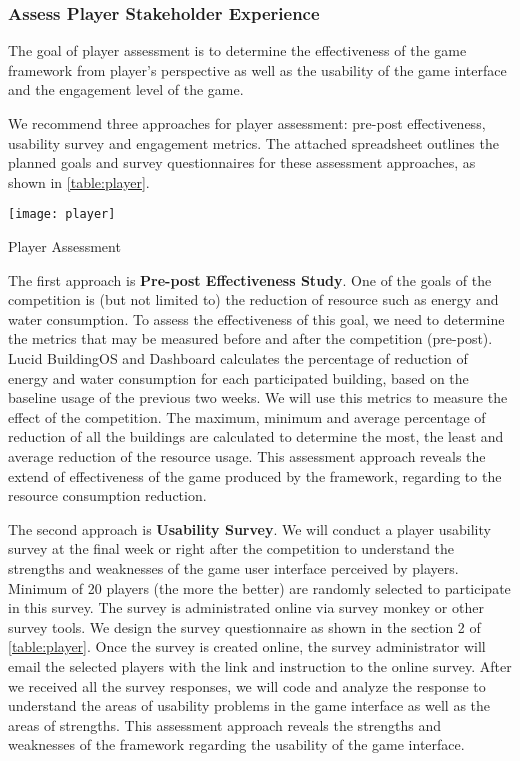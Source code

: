 \subsubsection{Assess Player Stakeholder Experience}

The goal of player assessment is to determine the effectiveness of the game
framework from player's perspective as well as the usability of the game interface and the engagement level of the game. 

We recommend three approaches for player assessment: pre-post effectiveness, usability survey and engagement metrics. The attached spreadsheet outlines the planned goals and survey questionnaires for these assessment approaches, as shown in \autoref{table:player}.

\begin{table}[ht!]
  \center
  \texttt{[image: player]}
  \caption{Player Assessment}
  \label{table:player}
\end{table}

The first approach is {\bf Pre-post Effectiveness Study}. One of the goals of the competition is (but not limited to) the reduction of resource such as energy and water consumption. To assess the effectiveness of this goal, we need to determine the metrics that may be measured before and after the competition (pre-post). Lucid BuildingOS and Dashboard calculates the percentage of reduction of energy and water consumption for each participated building, based on the baseline usage of the previous two weeks. We will use this metrics to measure the effect of the competition. The maximum, minimum and average percentage of reduction of all the buildings are calculated to determine the most, the least and average reduction of the resource usage. This assessment approach reveals the extend of effectiveness of the game produced by the framework, regarding to the resource consumption reduction. 

The second approach is {\bf Usability Survey}. We will conduct a player usability survey at the final week or right after the competition to understand the strengths and weaknesses of the game user interface perceived by players. Minimum of 20 players (the more the better) are randomly selected to participate in this survey. The survey is administrated online via survey monkey or other survey tools. We design the survey questionnaire as shown in the section 2 of \autoref{table:player}. Once the survey is created online, the survey administrator will email the selected players with the link and instruction to the online survey. After we received all the survey responses, we will code and analyze the response to understand the areas of usability problems in the game interface as well as the areas of strengths. This assessment approach reveals the strengths and weaknesses of the framework regarding the usability of the game interface.

